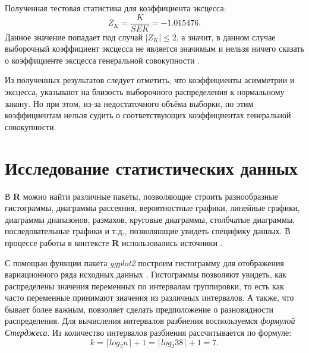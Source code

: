 Полученная тестовая статистика для коэффициента эксцесса:
\begin{equation*}
	Z_K = \frac{K}{SEK} = -1.015476.
\end{equation*}
Данное значение попадает под случай $\vert Z_K \vert \le 2$, а значит, в данном случае выборочный коэффициент эксцесса не является значимым и нельзя ничего сказать о коэффициенте эксцесса генеральной совокупности \cite[с.89]{Cramer1997}.

Из полученных результатов следует отметить, что коэффициенты асимметрии и эксцесса, указывают на близость выборочного распределения к нормальному закону. Но при этом, из-за недостаточного объёма выборки, по этим коэффициентам нельзя судить о соответствующих коэффициентах генеральной совокупности.


\section{Исследование статистических данных} %
\label{sec:analysis}

В \textbf{R} можно найти различные пакеты, позволяющие строить разнообразные гистограммы, диаграммы рассеяния, вероятностные графики, линейные графики, диаграммы диапазонов, размахов, круговые диаграммы, столбчатые диаграммы, последовательные графики и т.д., позволяющие увидеть специфику данных. В процессе работы в контексте \textbf{R} использовались источники \cite{Kabacoff2009R, Teetor2011RCook, Chang2012RGraph}.

С помощью функции пакета \textit{ggplot2} построим гистограмму для отображения вариационного ряда исходных данных \cite{Chang2012RGraph}. Гистограммы позволяют увидеть, как распределены значения переменных по интервалам группировки, то есть как часто переменные принимают значения из различных интервалов. А также, что бывает более важным, повзоляет сделать предположение о разновидности распределения. Для вычисления интервалов разбиения воспользуемся \textit{формулой Стерджеса}. Из \cite{Sturges1926Choice} количество интервалов разбиения рассчитывается по формуле:
\begin{equation}
\label{eq:sturges}
	k = \lceil log_{2}n \rceil + 1 = \lceil log_{2}38 \rceil + 1 = 7.
\end{equation}

